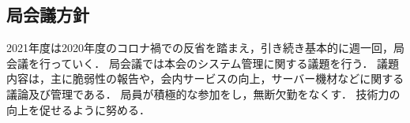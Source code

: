 \subsection*{局会議方針}

2021年度は2020年度のコロナ禍での反省を踏まえ，引き続き基本的に週一回，局会議を行っていく．
局会議では本会のシステム管理に関する議題を行う．
議題内容は，主に脆弱性の報告や，会内サービスの向上，サーバー機材などに関する議論及び管理である．
局員が積極的な参加をし，無断欠勤をなくす．
技術力の向上を促せるように努める．
